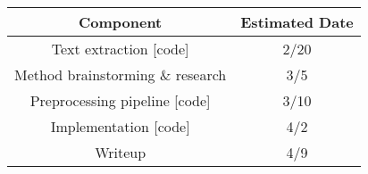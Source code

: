 \documentclass[conference]{sig-alternate-05-2015}
\begin{document}
\begin{center}
  \begin{tabular}{|c|c|} \hline

    \textbf{Component}                & \textbf{Estimated Date}    \\ \hline
    Text extraction [code]            & 2/20                       \\ \hline
    Method brainstorming \& research  & 3/5                        \\ \hline
    Preprocessing pipeline [code]     & 3/10                       \\ \hline
    Implementation [code]             & 4/2                        \\ \hline
    Writeup                           & 4/9                        \\ \hline

  \end{tabular}
\end{center}



\end{document}
